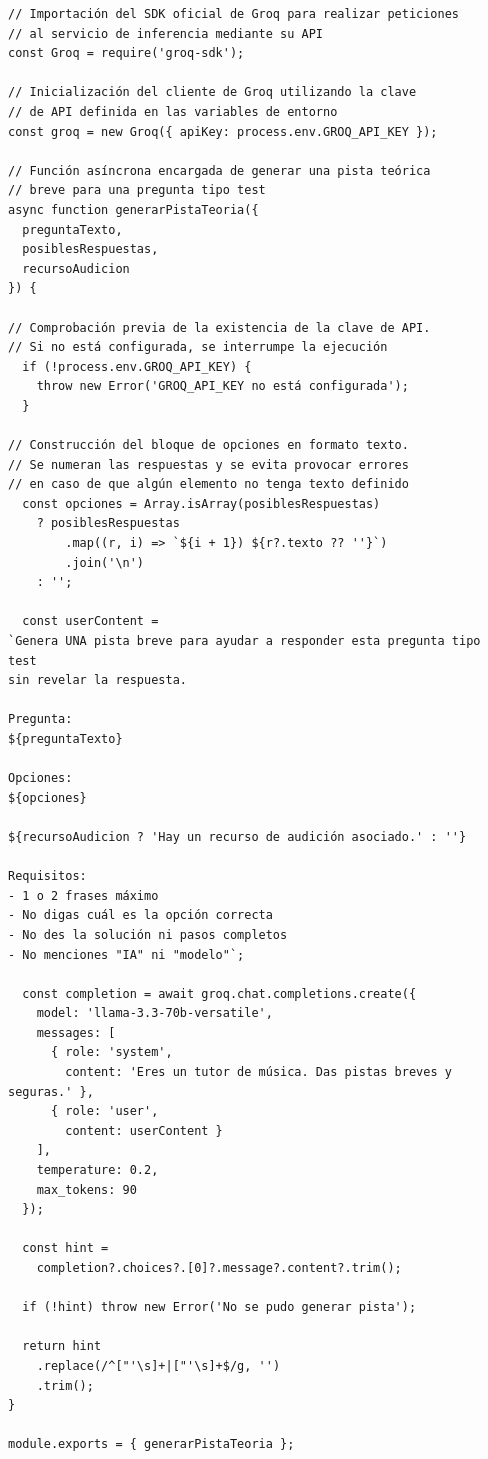 \begin{Verbatim}[frame=single, fontsize=\small, xleftmargin=10pt, xrightmargin=10pt]
// Importación del SDK oficial de Groq para realizar peticiones
// al servicio de inferencia mediante su API
const Groq = require('groq-sdk');

// Inicialización del cliente de Groq utilizando la clave
// de API definida en las variables de entorno
const groq = new Groq({ apiKey: process.env.GROQ_API_KEY });

// Función asíncrona encargada de generar una pista teórica
// breve para una pregunta tipo test
async function generarPistaTeoria({
  preguntaTexto,
  posiblesRespuestas,
  recursoAudicion
}) {

// Comprobación previa de la existencia de la clave de API.
// Si no está configurada, se interrumpe la ejecución
  if (!process.env.GROQ_API_KEY) {
    throw new Error('GROQ_API_KEY no está configurada');
  }

// Construcción del bloque de opciones en formato texto.
// Se numeran las respuestas y se evita provocar errores
// en caso de que algún elemento no tenga texto definido
  const opciones = Array.isArray(posiblesRespuestas)
    ? posiblesRespuestas
        .map((r, i) => `${i + 1}) ${r?.texto ?? ''}`)
        .join('\n')
    : '';

  const userContent =
`Genera UNA pista breve para ayudar a responder esta pregunta tipo test
sin revelar la respuesta.

Pregunta:
${preguntaTexto}

Opciones:
${opciones}

${recursoAudicion ? 'Hay un recurso de audición asociado.' : ''}

Requisitos:
- 1 o 2 frases máximo
- No digas cuál es la opción correcta
- No des la solución ni pasos completos
- No menciones "IA" ni "modelo"`;

  const completion = await groq.chat.completions.create({
    model: 'llama-3.3-70b-versatile',
    messages: [
      { role: 'system',
        content: 'Eres un tutor de música. Das pistas breves y seguras.' },
      { role: 'user',
        content: userContent }
    ],
    temperature: 0.2,
    max_tokens: 90
  });

  const hint =
    completion?.choices?.[0]?.message?.content?.trim();

  if (!hint) throw new Error('No se pudo generar pista');

  return hint
    .replace(/^["'\s]+|["'\s]+$/g, '')
    .trim();
}

module.exports = { generarPistaTeoria };
\end{Verbatim}

